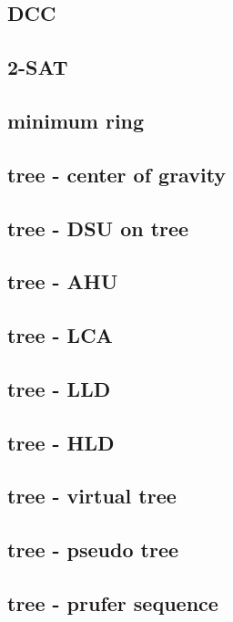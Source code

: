 \documentclass[UTF8, a4paper, titlepage, twoside]{ctexart}
\begin{document}
  \subsection{DCC}
    
    
    
    

  \subsection{2-SAT}
    

  \subsection{minimum ring}
    

  \subsection{tree - center of gravity}
  \subsection{tree - DSU on tree}
  \subsection{tree - AHU}
  \subsection{tree - LCA}
  \subsection{tree - LLD}
  \subsection{tree - HLD}
  \subsection{tree - virtual tree}
  \subsection{tree - pseudo tree}
  \subsection{tree - prufer sequence}
\end{document}
